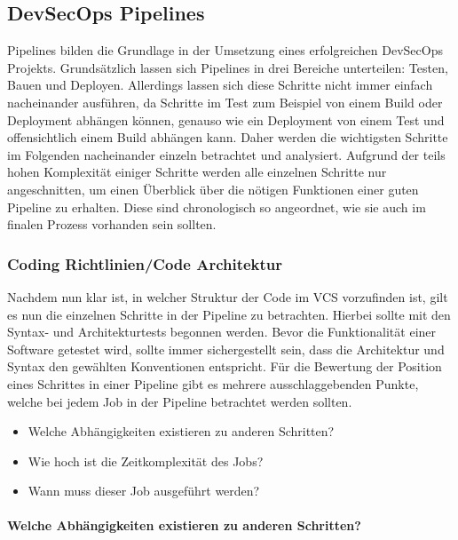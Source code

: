 \subsection{DevSecOps Pipelines}

Pipelines bilden die Grundlage in der Umsetzung eines erfolgreichen DevSecOps Projekts.
Grundsätzlich lassen sich Pipelines in drei Bereiche unterteilen: Testen, Bauen und Deployen.
Allerdings lassen sich diese Schritte nicht immer einfach nacheinander ausführen, da Schritte im Test zum Beispiel von einem Build oder Deployment abhängen können, genauso wie ein Deployment von einem Test und offensichtlich einem Build abhängen kann.
Daher werden die wichtigsten Schritte im Folgenden nacheinander einzeln betrachtet und analysiert.
Aufgrund der teils hohen Komplexität einiger Schritte werden alle einzelnen Schritte nur angeschnitten, um einen Überblick über die nötigen Funktionen einer guten Pipeline zu erhalten.
Diese sind chronologisch so angeordnet, wie sie auch im finalen Prozess vorhanden sein sollten.

\subsubsection{Coding Richtlinien/Code Architektur}\label{subsubsec:codingguidelines/codearchitecture}

Nachdem nun klar ist, in welcher Struktur der Code im VCS vorzufinden ist, gilt es nun die einzelnen Schritte in der Pipeline zu betrachten.
Hierbei sollte mit den Syntax- und Architekturtests begonnen werden.
Bevor die Funktionalität einer Software getestet wird, sollte immer sichergestellt sein, dass die Architektur und Syntax den gewählten Konventionen entspricht.
Für die Bewertung der Position eines Schrittes in einer Pipeline gibt es mehrere ausschlaggebenden Punkte, welche bei jedem Job in der Pipeline betrachtet werden sollten.
\begin{itemize}
    \item Welche Abhängigkeiten existieren zu anderen Schritten?
    \item Wie hoch ist die Zeitkomplexität des Jobs?
    \item Wann muss dieser Job ausgeführt werden?
\end{itemize}

\paragraph{Welche Abhängigkeiten existieren zu anderen Schritten?}

